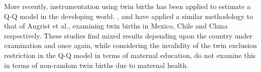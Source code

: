 More recently, instrumentation using twin births has been applied to estimate a Q-Q model in the developing world. \cite{FitzsimonsMalde2010}, \citet{Sanhueza2009} and \citet{Lietal2008} have applied a similar methodology to that of Angrist et al., examining twin births in Mexico, Chile and China respectively.  These studies find mixed results depending upon the country under examination and once again, while considering the invalidity of the twin exclusion restriction in the Q-Q model in terms of maternal education, do not examine this in terms of non-random twin births due to maternal health. 





























